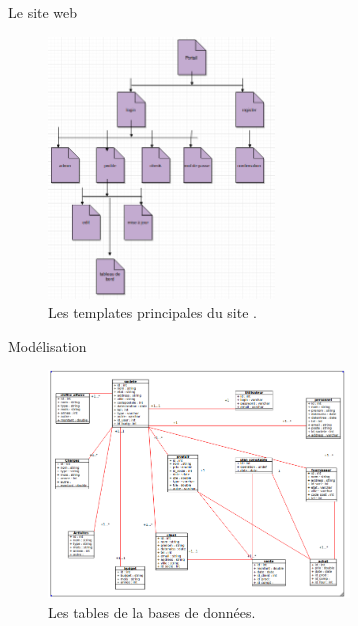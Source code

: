 \documentclass[french]{beamer}
\begin{document}
\begin{frame}{Le site web}
\begin{center}
\begin{figure}[htp]
  \centering
  \includegraphics[width=6cm]{p3.png}
  \caption{Les templates principales du site  .}
  \label{fig:une-autre-image}
\end{figure}

\end{center}
\end{frame}


\begin{frame}{Modélisation}
	\begin{center}
\begin{figure}[htp]
  \centering
  \includegraphics[width=8cm]{bd1.png}
  \caption{Les tables de la bases de données.}
  \label{fig:une-autre-image}
\end{figure}

\end{center}
\end{frame}
\end{document}
